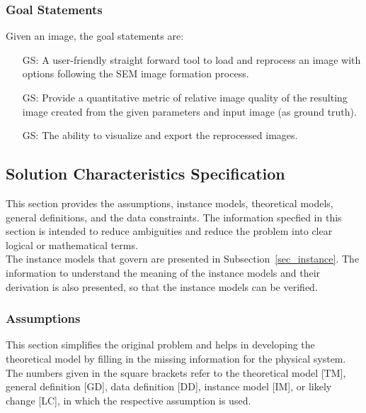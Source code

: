 \documentclass[12pt]{article}
\newcounter{goalnum} %
\begin{document}
\subsubsection{Goal Statements}

\noindent Given an image, the goal statements are:

\begin{itemize}

\item[GS\refstepcounter{goalnum}\thegoalnum \label{G_easeofuse}:] {
A user-friendly straight forward tool to load and reprocess an image with options following the SEM image formation process.
}

\item[GS\refstepcounter{goalnum}\thegoalnum \label{G_metric}:] {
Provide a quantitative metric of relative image quality of the resulting image created from the given parameters and input image (as ground truth).
}

\item[GS\refstepcounter{goalnum}\thegoalnum \label{G_visualize}:] {
The ability to visualize and export the reprocessed images.
}

\end{itemize}

\subsection{Solution Characteristics Specification}

This section provides the assumptions, instance models, theoretical models, general definitions, and the data constraints. The information specfied in this section is intended to reduce ambiguities and reduce the problem into clear logical or mathematical terms. \\

The instance models that govern \progname{} are presented in
Subsection~\ref{sec_instance}.  The information to understand the meaning of the
instance models and their derivation is also presented, so that the instance
models can be verified.

\subsubsection{Assumptions} \label{sec_assumpt}

This section simplifies the original problem and helps in developing the
theoretical model by filling in the missing information for the physical
system. The numbers given in the square brackets refer to the theoretical model
[TM], general definition [GD], data definition [DD], instance model [IM], or
likely change [LC], in which the respective assumption is used.
\end{document}
